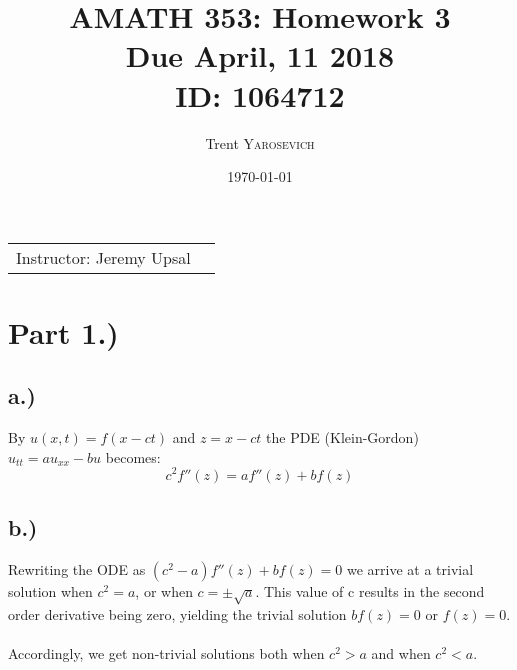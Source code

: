 \documentclass{article}
\title{AMATH 353: Homework 3 \\Due April, 11 2018 \\ ID: 1064712} %
\author{Trent \textsc{Yarosevich}} %
\date{\today} %
\begin{document}
\maketitle %
\setlength\parindent{1cm}

\begin{center}
\begin{tabular}{l r}
Instructor: Jeremy Upsal %
\end{tabular}
\end{center}


\section*{Part 1.)} 
\subsection*{a.)}
By $u(x, t)=f(x-ct)$ and $z=x-ct$ the PDE (Klein-Gordon) \\ $u_{tt} = au_{xx} - bu$ becomes:
\begin{equation}
c^2f''(z) = af''(z)+bf(z)
\end{equation}     
\subsection*{b.)}
Rewriting the ODE as $(c^2 - a)f''(z) + bf(z) = 0$ we arrive at a trivial solution when $c^2 = a$, or when $c = \pm\sqrt{a}$. This value of c results in the second order derivative being zero, yielding the trivial solution $bf(z) = 0$ or $f(z) = 0$.\\
\\
Accordingly, we get non-trivial solutions both when $c^2 > a$ and when $c^2 < a$.
\end{document}
